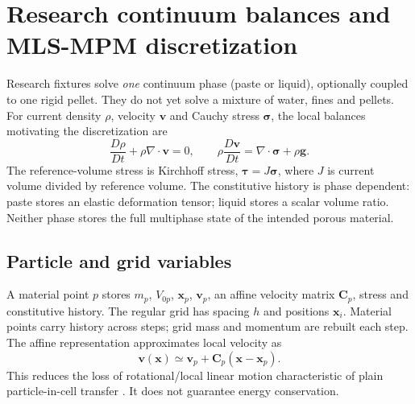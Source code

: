 \section{Research continuum balances and MLS-MPM discretization}
\label{sec:mpm}
Research fixtures solve \emph{one} continuum phase (paste or liquid), optionally
coupled to one rigid pellet. They do not yet solve a mixture of water, fines and pellets.
For current density $\rho$, velocity $\mathbf{v}$ and Cauchy stress
$\boldsymbol\sigma$, the local balances motivating the discretization are
\begin{equation}
 \frac{D\rho}{Dt}+\rho\nabla\cdot\mathbf{v}=0,\qquad
 \rho\frac{D\mathbf{v}}{Dt}=\nabla\cdot\boldsymbol\sigma+\rho\mathbf{g}.
 \label{eq:continuum-balance}
\end{equation}
The reference-volume stress is Kirchhoff stress,
$\boldsymbol\tau=J\boldsymbol\sigma$, where $J$ is current volume divided by
reference volume. The constitutive history is phase dependent: paste stores an
elastic deformation tensor; liquid stores a scalar volume ratio. Neither
phase stores the full multiphase state of the intended porous material.

\subsection{Particle and grid variables}
A material point $p$ stores $m_p$, $V_{0p}$, $\mathbf{x}_p$, $\mathbf{v}_p$,
an affine velocity matrix $\mathbf{C}_p$, stress and constitutive history.
The regular grid has spacing $h$ and positions $\mathbf{x}_i$. Material points
carry history across steps; grid mass and momentum are rebuilt each step.
The affine representation approximates local velocity as
\begin{equation}
 \mathbf{v}(\mathbf{x})\simeq
 \mathbf{v}_p+\mathbf{C}_p(\mathbf{x}-\mathbf{x}_p).
\end{equation}
This reduces the loss of rotational/local linear motion characteristic of plain
particle-in-cell transfer \cite{apic}. It does not guarantee energy conservation.

